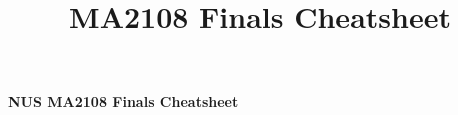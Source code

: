 \documentclass[10pt,landscape]{article}
\title{MA2108 Finals Cheatsheet}
\makeatletter
\renewcommand{\section}{\@startsection{section}{1}{0mm}%
                                {-1ex plus -.5ex minus -.2ex}%
                                {0.5ex plus .2ex}%
                                {\normalfont\large\bfseries}}
\renewcommand{\subsection}{\@startsection{subsection}{2}{0mm}%
                                {-1explus -.5ex minus -.2ex}%
                                {0.5ex plus .2ex}%
                                {\normalfont\normalsize\bfseries}}
\makeatother
\begin{document}
\raggedright
\scriptsize

\begin{center}
     \Large{\textbf{NUS MA2108 Finals Cheatsheet}} \\
\end{center}
\begin{multicols}{4}
\setlength{\premulticols}{1pt}
\setlength{\postmulticols}{1pt}
\setlength{\multicolsep}{1pt}
\setlength{\columnsep}{1pt}















\end{multicols}
\end{document}
